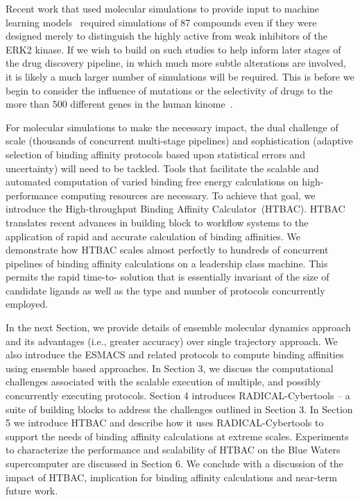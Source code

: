 Recent work that used molecular simulations to provide input to machine
learning models~\cite{Ash2017} required simulations of 87 compounds even if
they were designed merely to distinguish the highly active from weak
inhibitors of the ERK2 kinase. If we wish to build on such studies to help
inform later stages of the drug discovery pipeline, in which much more subtle
alterations are involved, it is likely a much larger number of simulations
will be required. This is before we begin to consider the influence of
mutations or the selectivity of drugs to the more than 500 different
genes in the human kinome~\cite{Li2016}.

For molecular simulations to make the necessary impact, the dual challenge of
scale (thousands of concurrent multi-stage pipelines) and sophistication
(adaptive selection of binding affinity protocols based upon statistical
errors and uncertainty) will need to be tackled. Tools that facilitate the
scalable and automated computation of varied binding free energy calculations
on high-performance computing resources are necessary. To achieve that goal,
we introduce the High-throughput Binding Affinity Calculator~(HTBAC). HTBAC
translates recent advances in building block to workflow systems to the
application of rapid and accurate calculation of  binding affinities. We
demonstrate how HTBAC scales almost perfectly to hundreds of concurrent
pipelines of binding affinity calculations on a leadership class machine. This
permits the rapid time-to- solution that is essentially invariant of the size
of candidate ligands as well as the type and number of protocols concurrently
employed.

In the next Section, we provide details of ensemble molecular dynamics
approach and its advantages (i.e., greater accuracy) over single trajectory
approach. We also introduce the ESMACS and related protocols to compute
binding affinities using ensemble based approaches. In Section 3, we discuss
the computational challenges associated with the scalable execution of
multiple, and possibly concurrently executing protocols. Section 4 introduces
RADICAL-Cybertools -- a suite of building blocks to address the challenges
outlined in Section 3. In Section 5 we introduce HTBAC and describe how it
uses RADICAL-Cybertools to support the needs of binding affinity calculations
at extreme scales. Experiments to characterize the performance and scalability
of HTBAC on the Blue Waters supercomputer are discussed in Section 6. We
conclude with a discussion of the impact of HTBAC, implication for binding
affinity calculations and near-term future work.

